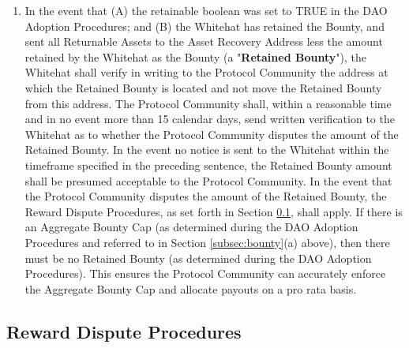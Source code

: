 \documentclass{article}
\begin{document}
\begin{enumerate}
\begin{enumerate}
              \item In the event that (A) the retainable boolean was set to TRUE in the DAO Adoption Procedures; and (B) the Whitehat has retained the Bounty, and sent all Returnable Assets to the Asset Recovery Address less the amount retained by the Whitehat as the Bounty (a "\textbf{Retained Bounty}"), the Whitehat shall verify in writing to the Protocol Community the address at which the Retained Bounty is located and not move the Retained Bounty from this address. The Protocol Community shall, within a reasonable time and in no event more than 15 calendar days, send written verification to the Whitehat as to whether the Protocol Community disputes the amount of the Retained Bounty. In the event no notice is sent to the Whitehat within the timeframe specified in the preceding sentence, the Retained Bounty amount shall be presumed acceptable to the Protocol Community. In the event that the Protocol Community disputes the amount of the Retained Bounty, the Reward Dispute Procedures, as set forth in Section \ref{subsec:reward_dispute}, shall apply. If there is an Aggregate Bounty Cap (as determined during the DAO Adoption Procedures and referred to in Section \ref{subsec:bounty}(a) above), then there must be no Retained Bounty (as determined during the DAO Adoption Procedures). This ensures the Protocol Community can accurately enforce the Aggregate Bounty Cap and allocate payouts on a pro rata basis.

          \end{enumerate}
\end{enumerate}

\subsection{Reward Dispute Procedures}\label{subsec:reward_dispute}
\end{document}
